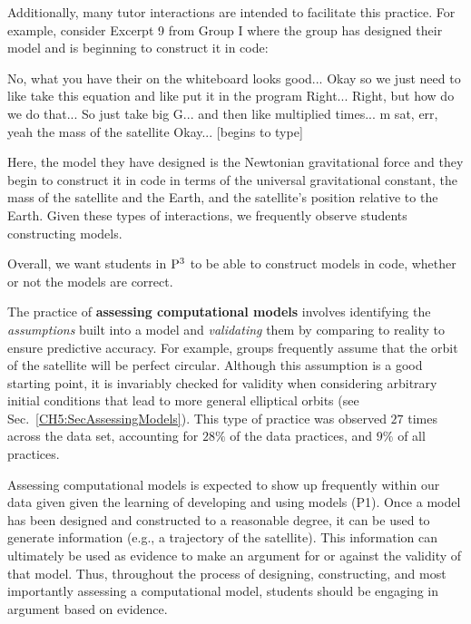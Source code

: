 \documentclass{msuphddissertation}
\begin{document}
\begin{doublespace}
Additionally, many tutor interactions are intended to facilitate this practice.  For example, consider Excerpt 9 from Group I where the group has designed their model and is beginning to construct it in code: \begin{description}
\TA No, what you have their {on the whiteboard} looks good...
\SD Okay so we just need to like take this equation and like
\SD put it in the program
\TA Right...
\SD Right, but how do we do that...
\SC So just take big G... and then like multiplied times...
\SC m sat, err, yeah the mass of the satellite
\SA Okay... [begins to type]
\end{description}  Here, the model they have designed is the Newtonian gravitational force and they begin to construct it in code in terms of the universal gravitational constant, the mass of the satellite and the Earth, and the satellite's position relative to the Earth.  Given these types of interactions, we frequently observe students constructing models.

Overall, we want students in ${\rm P}^{3}$ to be able to construct models in code, whether or not the models are correct.

The practice of \textbf{assessing computational models} involves identifying the \textit{assumptions} built into a model and \textit{validating} them by comparing to reality to ensure predictive accuracy.  For example, groups frequently assume that the orbit of the satellite will be perfect circular.  Although this assumption is a good starting point, it is invariably checked for validity when considering arbitrary initial conditions that lead to more general elliptical orbits (see Sec.~\ref{CH5:SecAssessingModels}).  This type of practice was observed $27$ times across the data set, accounting for $28\%$ of the data practices, and $9\%$ of all practices.

Assessing computational models is expected to show up frequently within our data given given the learning of developing and using models (P1).  Once a model has been designed and constructed to a reasonable degree, it can be used to generate information (e.g., a trajectory of the satellite).  This information can ultimately be used as evidence to make an argument for or against the validity of that model.  Thus, throughout the process of designing, constructing, and most importantly assessing a computational model, students should be engaging in argument based on evidence.


\end{doublespace}
\end{document}
